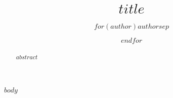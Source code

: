 \documentclass[runningheads]{llncs}
\begin{document}
%
\title{$title$}
%
%
\author{$for(author)$$author$$sep$ \and $endfor$}
%
%
\maketitle              %
%
\begin{abstract}
$abstract$
\end{abstract}

$body$


\end{document}
